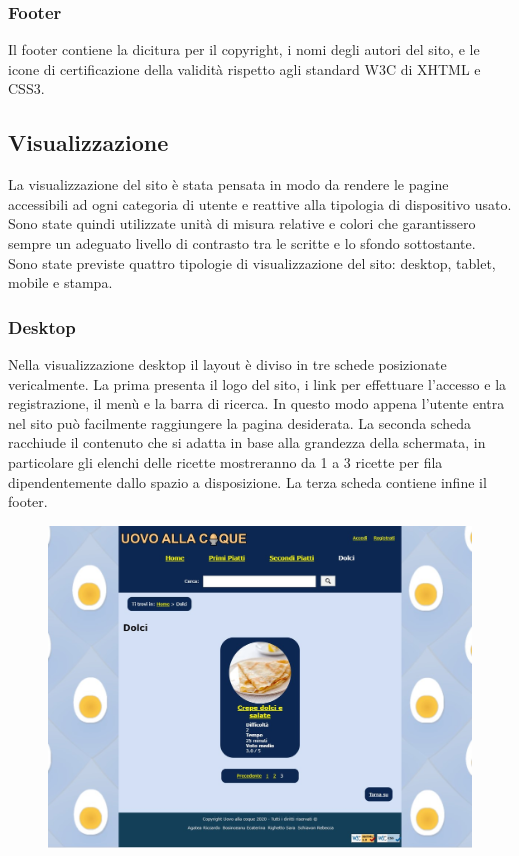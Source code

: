 \subsubsection{Footer}
\label{ssub:footer}
Il footer contiene la dicitura per il copyright, i nomi degli autori del sito, e le icone di certificazione della validità rispetto agli standard W3C di XHTML e CSS3.

\subsection{Visualizzazione} %
\label{sub:visualizzazione}
La visualizzazione del sito è stata pensata in modo da rendere le pagine accessibili ad ogni categoria di utente e reattive alla tipologia di dispositivo usato. Sono state quindi utilizzate unità di misura relative e colori che garantissero sempre un adeguato livello di contrasto tra le scritte e lo sfondo sottostante. \\
Sono state previste quattro tipologie di visualizzazione del sito: desktop, tablet, mobile e stampa.

\subsubsection{Desktop}
\label{ssub:desktop}
Nella visualizzazione desktop il layout è diviso in tre schede posizionate vericalmente. La prima presenta il logo del sito, i link per effettuare l'accesso e la registrazione, il menù e la barra di ricerca. In questo modo appena l'utente entra nel sito può facilmente raggiungere la pagina desiderata. La seconda scheda racchiude il contenuto che si adatta in base alla grandezza della schermata, in particolare gli elenchi delle ricette mostreranno da 1 a 3 ricette per fila dipendentemente dallo spazio a disposizione. La terza scheda contiene infine il footer. 
\begin{figure}[H]
	\centering
	\includegraphics[width=16cm]{img/progettazione/desktop.jpg}
\end{figure}

